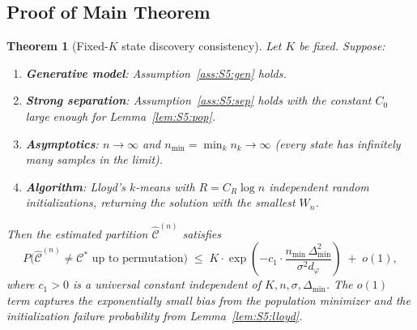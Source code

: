 \documentclass[twoside]{article}
\theoremstyle{plain}
\newtheorem{theorem}{Theorem}[section]
\theoremstyle{definition}
\theoremstyle{remark}
\newcommand{\1}{\mathbf{1}}
\renewcommand{\phi}{\varphi}
\newcommand{\cstar}{\mathcal{C}^*}
\newcommand{\hC}{\hat{\mathcal{C}}^{(n)}}
\begin{document}
\subsection{Proof of Main Theorem}
\label{sec:S5:main}

\begin{theorem}[Fixed-$K$ state discovery consistency]
\label{thm:S5:main}
Let $K$ be fixed.  Suppose:
\begin{enumerate}
\item \textbf{Generative model}: Assumption~\ref{ass:S5:gen} holds.
\item \textbf{Strong separation}: Assumption~\ref{ass:S5:sep} holds with
the constant $C_0$ large enough for Lemma~\ref{lem:S5:pop}.
\item \textbf{Asymptotics}: $n\to\infty$ and
$n_{\min}=\min_k n_k\to\infty$ (every state has infinitely many samples
in the limit).
\item \textbf{Algorithm}: Lloyd's $k$-means with
$R=C_R\log n$ independent random initializations, returning the solution
with the smallest $W_n$.
\end{enumerate}
Then the estimated partition $\hC$ satisfies
\begin{equation}
P\bigl(\hC\neq\cstar\text{ up to permutation}\bigr)
\;\le\; K\cdot\exp\!\left(
          -c_1\cdot\frac{n_{\min}\,\Delta_{\min}^2}{\sigma^2 d_\phi}\right)
        \;+\; o(1),
\label{eq:S5:main}
\end{equation}
where $c_1>0$ is a universal constant independent of
$K,n,\sigma,\Delta_{\min}$.  The $o(1)$ term captures the exponentially
small bias from the population minimizer and the initialization failure
probability from Lemma~\ref{lem:S5:lloyd}.
\end{theorem}
\end{document}
